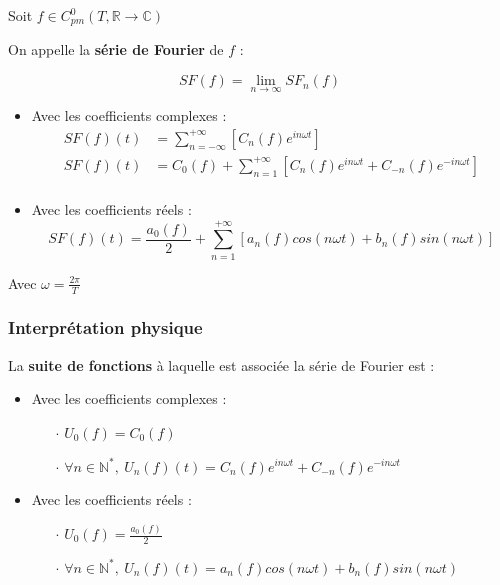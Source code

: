 \documentclass[12pt, a4paper]{article}
\begin{document}
\begin{tcolorbox}
	Soit $f \in C_{pm}^0(T, \mathbb{R} \to \mathbb{C})$
	
	On appelle la \textbf{série de Fourier} de $f$ :
	
	\begin{equation*}
		SF(f) = \lim_{n\to\infty} SF_n(f)
	\end{equation*}
	\begin{itemize}
		\item Avec les coefficients complexes :
			\begin{equation*}
				\begin{aligned}
					SF(f)(t) & = \sum_{n = -\infty}^{+\infty}[C_n(f)e^{in\omega t}] \\
					SF(f)(t) & = C_0(f) + \sum_{n = 1}^{+\infty}[C_n(f)e^{in\omega t} + C_{-n}(f)e^{-in\omega t}] \\
				\end{aligned}
			\end{equation*}

		\item Avec les coefficients réels :
			\begin{equation*}
				SF(f)(t) = \frac{a_0(f)}{2} + \sum_{n = 1}^{+\infty}[a_n(f)cos(n\omega t) + b_n(f)sin(n\omega t)]
			\end{equation*}
	\end{itemize}
	Avec $\displaystyle\omega = \frac{2\pi}{T}$
\end{tcolorbox}

\subsubsection{Interprétation physique}

La \textbf{suite de fonctions} à laquelle est associée la série de Fourier est :

\begin{itemize}
	\item Avec les coefficients complexes :
		\begin{itemize}
			\item[$\cdot$]
				$\displaystyle U_0(f) = C_0(f)$
			\item[$\cdot$]
				$\displaystyle \forall n \in \mathbb{N}^{*}, ~ U_n(f)(t) = C_n(f)e^{in\omega t} + C_{-n}(f)e^{-in\omega t}$
		\end{itemize}

	\item Avec les coefficients réels :
		\begin{itemize}
			\item[$\cdot$]
				$\displaystyle U_0(f) = \frac{a_0(f)}{2}$
			\item[$\cdot$]
				$\displaystyle \forall n \in \mathbb{N}^{*}, ~ U_n(f)(t) = a_n(f)cos(n\omega t) + b_n(f)sin(n\omega t)$
		\end{itemize}
\end{itemize}
\end{document}
